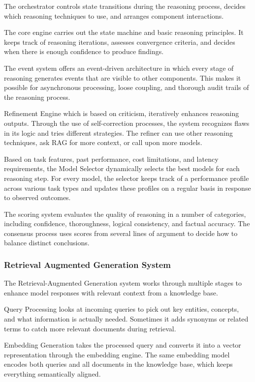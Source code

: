\documentclass[final,5p,times,twocolumn,authoryear,draft]{elsarticle}
\begin{document}
The orchestrator controls state transitions during the reasoning process, decides which reasoning techniques to use, and arranges component interactions.

The core engine carries out the state machine and basic reasoning principles. It keeps track of reasoning iterations, assesses convergence criteria, and decides when there is enough confidence to produce findings.

The event system offers an event-driven architecture in which every stage of reasoning generates events that are visible to other components. This makes it possible for asynchronous processing, loose coupling, and thorough audit trails of the reasoning process.
 
Refinement Engine which is based on criticism, iteratively enhances reasoning outputs. Through the use of self-correction processes, the system recognizes flaws in its logic and tries different strategies. The refiner can use other reasoning techniques, ask RAG for more context, or call upon more models.

Based on task features, past performance, cost limitations, and latency requirements, the Model Selector dynamically selects the best models for each reasoning step. For every model, the selector keeps track of a performance profile across various task types and updates these profiles on a regular basis in response to observed outcomes.

The scoring system evaluates the quality of reasoning in a number of categories, including confidence, thoroughness, logical consistency, and factual accuracy. The consensus process uses scores from several lines of argument to decide how to balance distinct conclusions.

\subsubsection{Retrieval Augmented Generation System}

The Retrieval-Augmented Generation system works through multiple stages to enhance model responses with relevant context from a knowledge base.

Query Processing looks at incoming queries to pick out key entities, concepts, and what information is actually needed. Sometimes it adds synonyms or related terms to catch more relevant documents during retrieval.

Embedding Generation takes the processed query and converts it into a vector representation through the embedding engine. The same embedding model encodes both queries and all documents in the knowledge base, which keeps everything semantically aligned.
\end{document}
